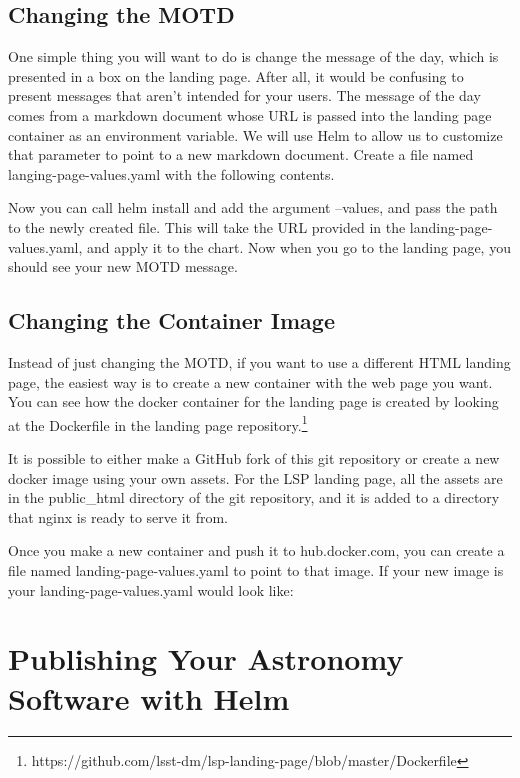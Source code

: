 \documentclass[11pt,twoside]{article}
\begin{document}
\subsection{Changing the MOTD}

One simple thing you will want to do is change the message of the day,
which is presented in a box on the landing page.  After all, it would be
confusing to present messages that aren't intended for your users.
The message of the day comes from a markdown document whose URL is passed
into the landing page container as an environment variable.
We will use Helm to allow us to customize that parameter
to point to a new markdown document.  Create a file named langing-page-values.yaml
with the following contents.


Now you can call helm install and add the argument --values, and pass the path to
the newly created file.  This will take the URL provided in the landing-page-values.yaml,
and apply it to the chart.  Now when you go to the landing page, you should see
your new MOTD message.

\subsection{Changing the Container Image}

Instead of just changing the MOTD, if you want to use a different HTML landing page,
the easiest way is to create a new container with the web page you want.  You can
see how the docker container for the landing page is created by looking at the
Dockerfile in the landing page repository.\footnote{https://github.com/lsst-dm/lsp-landing-page/blob/master/Dockerfile}

It is possible to either make a GitHub fork of this git repository or create
a new docker image using your own assets.  For the LSP landing page, all the assets
are in the public\_html directory of the git repository, and it is added to a directory
that nginx is ready to serve it from.

Once you make a new container and push it to hub.docker.com, you can create a
file named landing-page-values.yaml to point to that image.  If your new image is
 your landing-page-values.yaml would look like:


\section{Publishing Your Astronomy Software with Helm}
\end{document}
